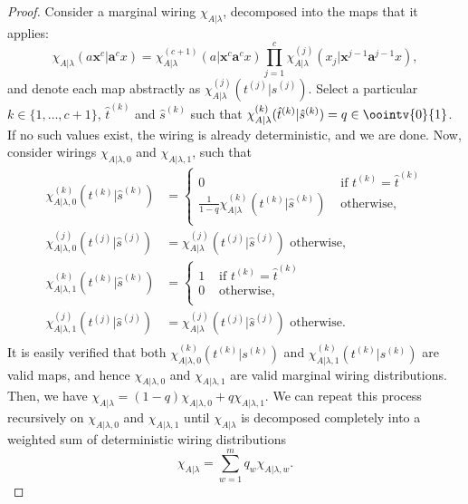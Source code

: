 \documentclass[10pt, a4paper]{article}
\numberwithin{equation}{section} %
\theoremstyle{definition}
\theoremstyle{plain}
\newcommand{\dintv}[2]{\mathopen\{#1,\ldots,#2\mathclose\}}
\newcommand{\?}{\mathrel{?}} %
\newcommand{\cvec}[1]{\boldsymbol{\mathbf{#1}}}    %
\begin{document}
              \begin{proof}
                Consider a marginal wiring \(\chi_{A|\lambda}\), decomposed into the maps that it applies:
                \begin{equation}\label{eqn:mapdecomp}
                  \chi_{A|\lambda}(a\cvec{x}^c|\cvec{a}^cx) = \chi_{A|\lambda}^{(c+1)}(a|\cvec{x}^c\cvec{a}^{c}x) \prod_{j=1}^c \chi_{A|\lambda}^{(j)}(x_j|\cvec{x}^{j-1}\cvec{a}^{j-1}x),
                \end{equation}
                and denote each map abstractly as \(\chi_{A|\lambda}^{(j)}(t^{(j)}|s^{(j)})\).
                Select a particular \(k\in\dintv{1}{c+1}\), \(\hat{t}^{(k)}\) and \(\hat{s}^{(k)}\) such that \(\chi_{A|\lambda}^{(k)}(\hat{t}^{(k)}|\hat{s}^{(k)}) = q \in \oointv{0}{1}\). If no such values exist, the wiring is already deterministic, and we are done.
                Now, consider wirings \(\chi_{A|\lambda,0}\) and \(\chi_{A|\lambda,1}\), such that
                \begin{align*}
                  \chi^{(k)}_{A|\lambda,0}(t^{(k)}|\hat{s}^{(k)}) &=
                  \begin{cases}
                    0 & \text{ if } t^{(k)} = \hat{t}^{(k)} \\
                    \frac{1}{1-q} \chi_{A|\lambda}^{(k)}(t^{(k)}|\hat{s}^{(k)}) & \text{ otherwise,} \\
                  \end{cases} \\
                  \chi^{(j)}_{A|\lambda,0}(t^{(j)}|\hat{s}^{(j)}) &= \chi_{A|\lambda}^{(j)}(t^{(j)}|\hat{s}^{(j)}) \text{ otherwise,} \\
                  \chi^{(k)}_{A|\lambda,1}(t^{(k)}|\hat{s}^{(k)}) &=
                  \begin{cases}
                    1 & \text{ if } t^{(k)} = \hat{t}^{(k)} \\
                    0 & \text{ otherwise,} \\
                  \end{cases} \\
                  \chi^{(j)}_{A|\lambda,1}(t^{(j)}|\hat{s}^{(j)}) &= \chi_{A|\lambda}^{(j)}(t^{(j)}|\hat{s}^{(j)}) \text{ otherwise.} \\
                \end{align*}
                It is easily verified that both \(\chi_{A|\lambda,0}^{(k)}(t^{(k)}|s^{(k)})\) and \(\chi_{A|\lambda,1}^{(k)}(t^{(k)}|s^{(k)})\) are valid maps, and hence \(\chi_{A|\lambda,0}\) and \(\chi_{A|\lambda,1}\) are valid marginal wiring distributions. Then, we have \(\chi_{A|\lambda} = (1-q)\chi_{A|\lambda,0} + q\chi_{A|\lambda,1}\). We can repeat this process recursively on \(\chi_{A|\lambda,0}\) and \(\chi_{A|\lambda,1}\) until \(\chi_{A|\lambda}\) is decomposed completely into a weighted sum of deterministic wiring distributions
                \[ \chi_{A|\lambda} = \sum_{w=1}^m q_w \chi_{A|\lambda,w}. \]


\end{proof}
\end{document}
